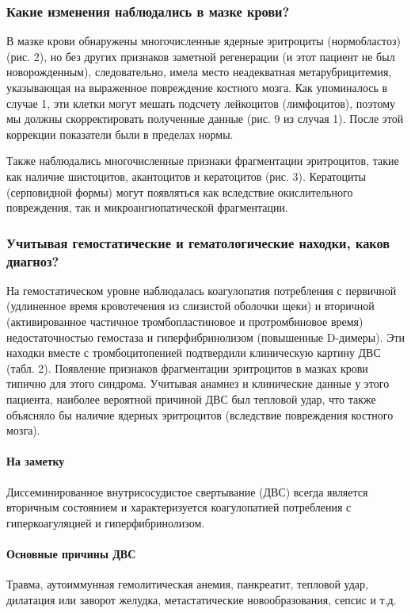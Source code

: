 \documentclass[a4paper,12pt]{book}
\begin{document}
\subsubsection*{Какие изменения наблюдались в мазке крови?}
В мазке крови обнаружены многочисленные ядерные эритроциты (нормобластоз) (рис. 2), но без других признаков заметной регенерации (и этот пациент не был новорожденным), следовательно, имела место неадекватная метарубрицитемия, указывающая на выраженное повреждение костного мозга. Как упоминалось в случае 1, эти клетки могут мешать подсчету лейкоцитов (лимфоцитов), поэтому мы должны скорректировать полученные данные (рис. 9 из случая 1). После этой коррекции показатели были в пределах нормы.

Также наблюдались многочисленные признаки фрагментации эритроцитов, такие как наличие шистоцитов, акантоцитов и кератоцитов (рис. 3). Кератоциты (серповидной формы) могут появляться как вследствие окислительного повреждения, так и микроангиопатической фрагментации.

\subsubsection*{Учитывая гемостатические и гематологические находки, каков диагноз?}
На гемостатическом уровне наблюдалась коагулопатия потребления с первичной (удлиненное время кровотечения из слизистой оболочки щеки) и вторичной (активированное частичное тромбопластиновое и протромбиновое время) недостаточностью гемостаза и гиперфибринолизом (повышенные D-димеры). Эти находки вместе с тромбоцитопенией подтвердили клиническую картину ДВС (табл. 2). Появление признаков фрагментации эритроцитов в мазках крови типично для этого синдрома. Учитывая анамнез и клинические данные у этого пациента, наиболее вероятной причиной ДВС был тепловой удар, что также объясняло бы наличие ядерных эритроцитов (вследствие повреждения костного мозга).

\paragraph{На заметку}
Диссеминированное внутрисосудистое свертывание (ДВС) всегда является вторичным состоянием и характеризуется коагулопатией потребления с гиперкоагуляцией и гиперфибринолизом.

\paragraph{Основные причины ДВС}
Травма, аутоиммунная гемолитическая анемия, панкреатит, тепловой удар, дилатация или заворот желудка, метастатические новообразования, сепсис и т.д.
\end{document}
